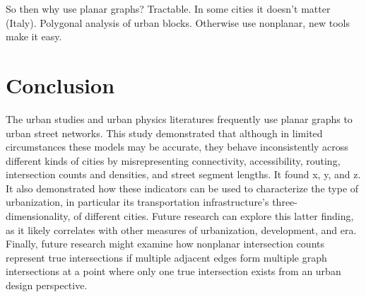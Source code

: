 \documentclass[Afour,sageh,times]{sagej}
\begin{document}
So then why use planar graphs? Tractable. In some cities it doesn't matter (Italy). Polygonal analysis of urban blocks. Otherwise use nonplanar, new tools make it easy.


\section{Conclusion}

The urban studies and urban physics literatures frequently use planar graphs to urban street networks. This study demonstrated that although in limited circumstances these models may be accurate, they behave inconsistently across different kinds of cities by misrepresenting connectivity, accessibility, routing, intersection counts and densities, and street segment lengths. It found x, y, and z. It also demonstrated how these indicators can be used to characterize the type of urbanization, in particular its transportation infrastructure's three-dimensionality, of different cities. Future research can explore this latter finding, as it likely correlates with other measures of urbanization, development, and era. Finally, future research might examine how nonplanar intersection counts represent true intersections if multiple adjacent edges form multiple graph intersections at a point where only one true intersection exists from an urban design perspective.




\end{document}
